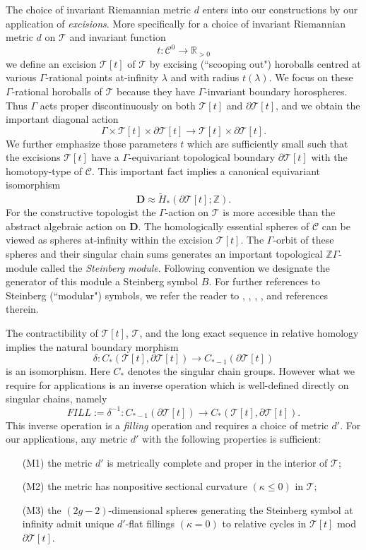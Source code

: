 \documentclass[12pt]{amsart}
\theoremstyle{definition}
\theoremstyle{remark}
\newcommand{\bR}{\mathbb{R}}
\newcommand{\bZ}{\mathbb{Z}}
\newcommand{\del}{\partial}
\newcommand{\bD}{\textbf{D}}
\newcommand{\sC}{\mathscr{C}}
\newcommand{\sT}{\mathscr{T}}
\begin{document}
The choice of invariant Riemannian metric $d$ enters into our constructions by our application of \emph{excisions}. More specifically for a choice of invariant Riemannian metric $d$ on $\sT$ and invariant function $$t: \sC^0 \to \bR_{>0}$$ we define an excision $\sT[t]$ of $\sT$ by excising (``scooping out") horoballs centred at various $\Gamma$-rational points at-infinity $\lambda$ and with radius $t(\lambda)$. We focus on these $\Gamma$-rational horoballs of $\sT$ because they have $\Gamma$-invariant boundary horospheres. Thus $\Gamma$ acts proper discontinuously on both $\sT[t]$ and $\del \sT[t]$, and we obtain the important diagonal action $$\Gamma \times \sT[t] \times \del \sT[t] \to \sT[t] \times \del \sT[t]. $$ We further emphasize those parameters $t$ which are sufficiently small such that the excisions $\sT[t]$  have a $\Gamma$-equivariant topological boundary $\del \sT[t]$ with the homotopy-type of $\sC$. This important fact implies a canonical equivariant isomorphism \begin{equation}\label{caniso}
\bD\approx \tilde{H}_*(\del \sT[t]; \bZ).
\end{equation} For the constructive topologist the $\Gamma$-action on $\sT$ is more accesible than the abstract algebraic action on $\bD$. The homologically essential spheres of $\sC$ can be viewed as spheres at-infinity within the excision $\sT[t]$. The $\Gamma$-orbit of these spheres and their singular chain sums generates an important topological $\bZ \Gamma$-module called the \emph{Steinberg module}. Following convention we designate the generator of this module a Steinberg symbol $B$. For further references to Steinberg (``modular") symbols, we refer the reader to \cite{manin}, \cite{AR}, \cite{AGM}, \cite{Stein}, \cite{Sol} and references therein. 

The contractibility of $\sT[t]$, $\sT$, and the long exact sequence in relative homology implies the natural boundary morphism $$\delta: C_*(\sT[t], \del \sT[t]) \to C_{*-1}(\del \sT[t])$$ is an isomorphism. Here $C_*$ denotes the singular chain groups. However what we require for applications is an inverse operation which is well-defined directly on singular chains, namely $$FILL:=\delta^{-1}: C_{*-1}(\del \sT[t]) \to C_*(\sT[t], \del \sT[t]).$$ This inverse operation is a \emph{filling} operation and requires a choice of metric $d'$. For our applications, any metric $d'$ with the following properties is sufficient:

\begin{itemize}
\item[(M1)] the metric $d'$ is metrically complete and proper in the interior of $\sT$;
\item[(M2)] the metric has nonpositive sectional curvature $(\kappa \leq 0)$ in $\sT$;
\item[(M3)] the $(2g-2)$-dimensional spheres generating the Steinberg symbol at infinity admit unique $d'$-flat fillings $(\kappa =0)$ to relative cycles in $\sT[t]$ mod $\del \sT[t]$.
\end{itemize}
\end{document}
